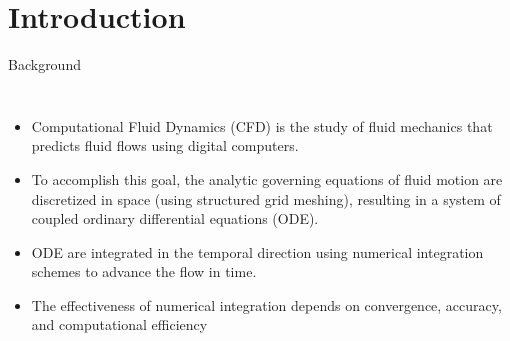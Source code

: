 
\usepackage{subfig}




\frame{\titlepage}

\section{Introduction}
\begin{frame}{Background}
  \begin{columns}
      \begin{itemize}
        \item Computational Fluid Dynamics (CFD) is the study of fluid mechanics that predicts fluid
          flows using digital computers.
        \item To accomplish this goal, the analytic governing equations of fluid motion are
          discretized in space (using structured grid meshing), resulting in a system of coupled
          ordinary differential equations (ODE).
        \item ODE are integrated in the temporal direction using numerical integration schemes to
          advance the flow in time.
        \item The effectiveness of numerical integration depends on convergence, accuracy, and
          computational efficiency
      \end{itemize}   
  \end{columns}
\end{frame}

